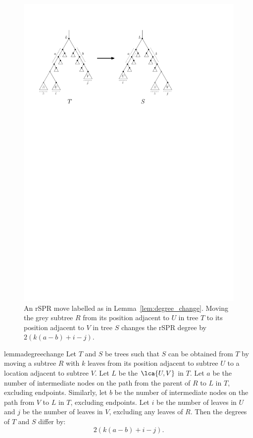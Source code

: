 \documentclass[11pt]{amsart}
\let\MYoriglatexcaption\caption
\renewcommand{\caption}[2][\relax]{\MYoriglatexcaption[#2]{#2}}
\begin{document}
\begin{figure}
	\includegraphics[width=\textwidth]{figs/spr-degree-change}
	\caption{An rSPR move labelled as in Lemma~\ref{lem:degree_change}.
Moving the grey subtree $R$ from its position adjacent to $U$ in tree $T$ to its position adjacent to $V$ in tree $S$ changes the rSPR degree by $2\left(k(a-b) + i - j\right)$.}
	\label{fig:spr-degree-change}
\end{figure}

\begin{restatable}{lemma}{degreechange}
\label{lem:degree_change}
Let $T$ and $S$ be trees such that $S$ can be obtained from $T$ by moving a subtree $R$ with $k$ leaves from its position adjacent to subtree $U$ to a location adjacent to subtree $V$.
Let $L$ be the $\lca{U,V}$ in $T$.
Let $a$ be the number of intermediate nodes on the path from the parent of $R$ to $L$ in $T$, excluding endpoints.
Similarly, let $b$ be the number of intermediate nodes on the path from $V$ to $L$ in $T$, excluding endpoints.
Let $i$ be the number of leaves in $U$ and $j$ be the number of leaves in $V$, excluding any leaves of $R$.
Then the degrees of $T$ and $S$ differ by:
$$2\left(k(a-b) + i - j\right).$$

\end{restatable}
\end{document}
